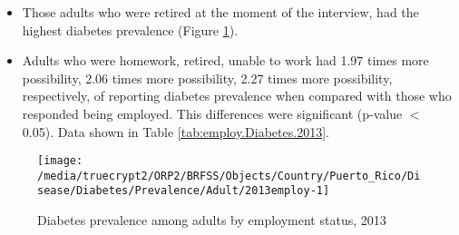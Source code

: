  
 \newpage
\begin{itemize}


\item Those adults who were 
retired at the moment of the interview, had the highest diabetes prevalence (Figure \ref{fig:employ.Diabetes.2013}).

\item Adults who were homework, retired, unable to work had 1.97 times more possibility, 2.06 times more possibility, 2.27 times more possibility, respectively, of reporting diabetes prevalence when compared with those who responded being employed. This differences were significant (p-value $<$ 0.05). 
Data shown in Table \ref{tab:employ.Diabetes.2013}.


\end{itemize}

\begin{figure}[H]
\caption{Diabetes prevalence among adults by employment status, 
         2013}
\label{fig:employ.Diabetes.2013}
\begin{knitrout}
\color{fgcolor}

{\centering \texttt{[image: /media/truecrypt2/ORP2/BRFSS/Objects/Country/Puerto\_Rico/Disease/Diabetes/Prevalence/Adult/2013employ-1]} 

}



\end{knitrout}
 \end{figure}

